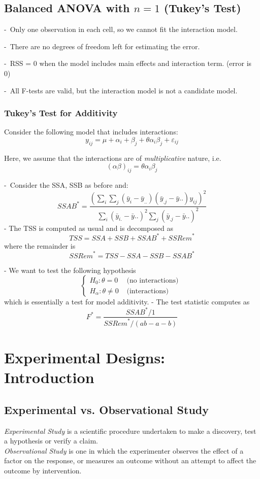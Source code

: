 \documentclass[11pt,a4paper]{article}
\begin{document}
\subsection{ Balanced ANOVA with $n = 1$ (Tukey’s Test)}
-\ Only one observation in each cell, so we cannot ﬁt the interaction model.

-\ There are no degrees of freedom left for estimating the error.

-\ RSS = 0 when the model includes main eﬀects and interaction term. (error is 0)

-\ All F-tests are valid, but the interaction model is not a candidate model.

\subsubsection{ Tukey’s Test for Additivity}
Consider the following model that includes interactions:
$$y_{ij}=\mu+\alpha_i+\beta_j+\theta\alpha_i\beta_j+\varepsilon_{ij}$$

Here, we assume that the interactions are of \textit{multiplicative} nature, i.e.
$$(\alpha\beta)_{ij}=\theta\alpha_i\beta_j$$

-\ Consider the SSA, SSB as before and:
$$
{S S A B}^{*}=\frac{\left(\sum_{i} \sum_{j}\left(\bar{y}_{i}-\bar{y}_{. .}\right)\left(\bar{y}_{. j}-\bar{y} . .\right) y_{i j}\right)^{2}}{\sum_{i}\left(\bar{y}_{i .}-\bar{y} . .\right)^{2} \sum_{j}\left(\bar{y}_{. j}-\bar{y} . .\right)^{2}}
$$
- The TSS is computed as usual and is decomposed as
$$
T S S=S S A+S S B+{S S A B}^{*}+{S S R e m}^{*}
$$
where the remainder is
$$
{S S R e m}^{*}=T S S-S S A-S S B-S S A B^{*}
$$

- We want to test the following hypothesis
$$
\begin{cases}H_{0}: \theta=0 & \text { (no interactions) } \\ H_{\alpha}: \theta \neq 0 & \text { (interactions) }\end{cases}
$$
which is essentially a test for model additivity.
- The test statistic computes as
$$
F^{*}=\frac{{S S A B}^{*} / 1}{{S S R e m}^{*} /(a b-a-b)}
$$


\section{ Experimental Designs: Introduction}
\subsection{ Experimental vs. Observational Study}
\textit{Experimental Study} is a scientific procedure undertaken to make a discovery, test a hypothesis or verify a claim.\\
\textit{Observational Study} is one in which the experimenter observes the effect of a factor on the response, or measures an outcome without an attempt to affect the outcome by intervention.
\end{document}
